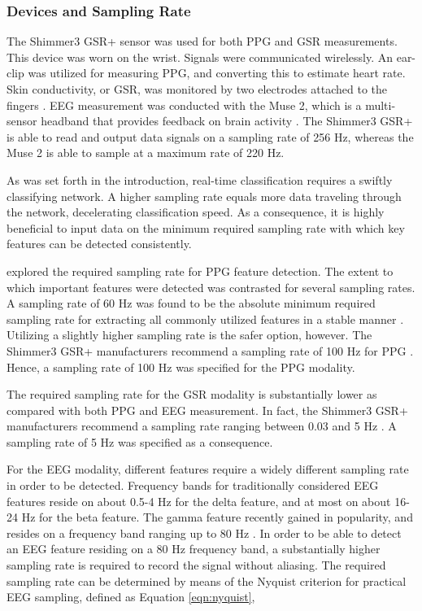 \documentclass[12pt]{article}
\begin{document}
\subsubsection{Devices and Sampling Rate}
The Shimmer3 GSR+ sensor was used for both PPG and GSR measurements. This device was worn on the wrist. Signals were communicated wirelessly. An ear-clip was utilized for measuring PPG, and converting this to estimate heart rate. Skin conductivity, or GSR, was monitored by two electrodes attached to the fingers \cite{shimmer}. EEG measurement was conducted with the Muse 2, which is a multi-sensor headband that provides feedback on brain activity \cite{muse}. The Shimmer3 GSR+ is able to read and output data signals on a sampling rate of 256 Hz, whereas the Muse 2 is able to sample at a maximum rate of 220 Hz. 

As was set forth in the introduction, real-time classification requires a swiftly classifying network. A higher sampling rate equals more data traveling through the network, decelerating classification speed. As a consequence, it is highly beneficial to input data on the minimum required sampling rate with which key features can be detected consistently.

 explored the required sampling rate for PPG feature detection. The extent to which important features were detected was contrasted for several sampling rates. A sampling rate of 60 Hz was found to be the absolute minimum required sampling rate for extracting all commonly utilized features in a stable manner \cite{fujita2019evaluation}. Utilizing a slightly higher sampling rate is the safer option, however. The Shimmer3 GSR+ manufacturers recommend a sampling rate of 100 Hz for PPG \cite{shimmer}. Hence, a sampling rate of 100 Hz was specified for the PPG modality. 

The required sampling rate for the GSR modality is substantially lower as compared with both PPG and EEG measurement. In fact, the Shimmer3 GSR+ manufacturers recommend a sampling rate ranging between 0.03 and 5 Hz \cite{shimmer}. A sampling rate of 5 Hz was specified as a consequence. 

For the EEG modality, different features require a widely different sampling rate in order to be detected. Frequency bands for traditionally considered EEG features reside on about 0.5-4 Hz for the delta feature, and at most on about 16-24 Hz for the beta feature. The gamma feature recently gained in popularity, and resides on a frequency band ranging up to 80 Hz \cite{weiergraeber2016sampling}. In order to be able to detect an EEG feature residing on a 80 Hz frequency band, a substantially higher sampling rate is required to record the signal without aliasing. The required sampling rate can be determined by means of the Nyquist criterion for practical EEG sampling, defined as Equation \ref{eqn:nyquist},
\end{document}

